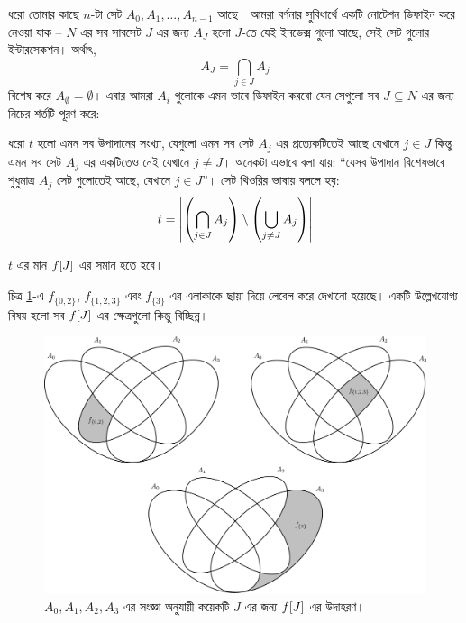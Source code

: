 ধরো তোমার কাছে $n$-টা সেট $A_0, A_1, \ldots, A_{n-1}$ আছে। আমরা বর্ণনার
সুবিধার্থে একটি নোটেশন ডিফাইন করে নেওয়া যাক -- $N$ এর সব সাবসেট
$J$ এর জন্য $A_J$ হলো $J$-তে যেই ইনডেক্স গুলো আছে,
সেই সেট গুলোর ইন্টারসেকশন। অর্থাৎ,
\[
  A_J = \bigcap_{j \in J} A_j
\]
বিশেষ করে $A_\emptyset = \emptyset$।
এবার আমরা $A_i$ গুলোকে এমন ভাবে ডিফাইন করবো যেন সেগুলো সব $J
\subseteq N$ এর জন্য নিচের শর্তটি পূরণ করে:
\begin{bigcondition}
  ধরো $t$ হলো এমন সব উপাদানের সংখ্যা, যেগুলো এমন সব সেট $A_j$ এর
  প্রত্যেকটিতেই আছে যেখানে $j \in J$ কিন্তু এমন সব সেট $A_j$ এর
  একটিতেও নেই যেখানে $j \ne J$। অনেকটা
  এভাবে বলা যায়: ``যেসব উপাদান বিশেষভাবে শুধুমাত্র $A_j$ সেট গুলোতেই আছে,
  যেখানে $j \in J$''। সেট থিওরির ভাষায় বললে হয়:
  \[
    t = \left|  \left ( \bigcap_{j \in J} A_j \right ) \setminus
    \left ( \bigcup_{j \ne J} A_j \right )  \right|
  \]

  $t$ এর মান $f[J]$ এর সমান হতে হবে।
\end{bigcondition}
চিত্র \ref{two_f_example}-এ $f_{\{0, 2\}}$, $f_{\{1,2,3\}}$ এবং
$f_{\{3\}}$ এর এলাকাকে ছায়া দিয়ে লেবেল করে দেখানো হয়েছে। একটি উল্লেখযোগ্য
বিষয় হলো সব $f[J]$ এর ক্ষেত্রগুলো কিন্তু বিচ্ছিন্ন।
\begin{figure}[!ht]
  \centering
  \includegraphics[width=\textwidth]{./img/sos-dp/4set/two_f_example.pdf}
  \caption{$A_0, A_1, A_2, A_3$ এর সংজ্ঞা অনুযায়ী কয়েকটি $J$ এর জন্য
  $f[J]$ এর উদাহরণ।}
  \label{two_f_example}
\end{figure}

